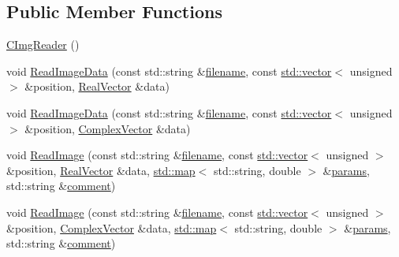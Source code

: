 \subsection*{Public Member Functions}
\begin{DoxyCompactItemize}
\item 
\hyperlink{class_q_s_t_e_m_1_1_c_img_reader_ac24d2c6d2661da3365217db74e0775b6}{C\-Img\-Reader} ()
\item 
void \hyperlink{class_q_s_t_e_m_1_1_c_img_reader_af14ac98a7a3eaeb8830879ee82d51f29}{Read\-Image\-Data} (const std\-::string \&\hyperlink{write_fields2_file_8m_af3723aa817dbb65282d5e1db81f08ad8}{filename}, const \hyperlink{qmb_8m_af54b69a32590de218622e869b06b47b3}{std\-::vector}$<$ unsigned $>$ \&position, \hyperlink{namespace_q_s_t_e_m_a8dfe9e1dbecce3838cb082d96e991ba7}{Real\-Vector} \&data)
\item 
void \hyperlink{class_q_s_t_e_m_1_1_c_img_reader_a2bba6627168ebb76b82448ccc372c12e}{Read\-Image\-Data} (const std\-::string \&\hyperlink{write_fields2_file_8m_af3723aa817dbb65282d5e1db81f08ad8}{filename}, const \hyperlink{qmb_8m_af54b69a32590de218622e869b06b47b3}{std\-::vector}$<$ unsigned $>$ \&position, \hyperlink{namespace_q_s_t_e_m_af210a2c1f9afae1deed746dcd9276221}{Complex\-Vector} \&data)
\item 
void \hyperlink{class_q_s_t_e_m_1_1_c_img_reader_aef0794d71af2a84341d511468dda85e2}{Read\-Image} (const std\-::string \&\hyperlink{write_fields2_file_8m_af3723aa817dbb65282d5e1db81f08ad8}{filename}, const \hyperlink{qmb_8m_af54b69a32590de218622e869b06b47b3}{std\-::vector}$<$ unsigned $>$ \&position, \hyperlink{namespace_q_s_t_e_m_a8dfe9e1dbecce3838cb082d96e991ba7}{Real\-Vector} \&data, \hyperlink{_displacement_params_8m_af619c74fd72bdb64d115463dff2720cd}{std\-::map}$<$ std\-::string, double $>$ \&\hyperlink{image_sim_8m_ad57b218fb254a1624c09ad71cb6b6415}{params}, std\-::string \&\hyperlink{image_sim_8m_aea4cc4bd8e43a7f8ebf9b0ee3da8d681}{comment})
\item 
void \hyperlink{class_q_s_t_e_m_1_1_c_img_reader_a4773c00af0b80808c0446e7a1a7b15d7}{Read\-Image} (const std\-::string \&\hyperlink{write_fields2_file_8m_af3723aa817dbb65282d5e1db81f08ad8}{filename}, const \hyperlink{qmb_8m_af54b69a32590de218622e869b06b47b3}{std\-::vector}$<$ unsigned $>$ \&position, \hyperlink{namespace_q_s_t_e_m_af210a2c1f9afae1deed746dcd9276221}{Complex\-Vector} \&data, \hyperlink{_displacement_params_8m_af619c74fd72bdb64d115463dff2720cd}{std\-::map}$<$ std\-::string, double $>$ \&\hyperlink{image_sim_8m_ad57b218fb254a1624c09ad71cb6b6415}{params}, std\-::string \&\hyperlink{image_sim_8m_aea4cc4bd8e43a7f8ebf9b0ee3da8d681}{comment})

\end{DoxyCompactItemize}
